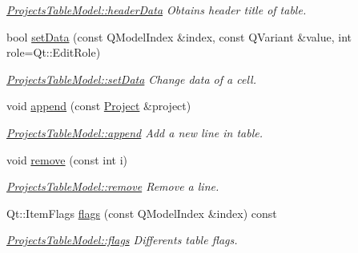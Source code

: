 \begin{DoxyCompactItemize}
\begin{DoxyCompactList}\small\item\em \hyperlink{classGui_1_1Widgets_1_1WdgModels_1_1ProjectsTableModel_ad984702eada2770507a1507ea9e3e685}{Projects\-Table\-Model\-::header\-Data} Obtains header title of table. \end{DoxyCompactList}\item 
bool \hyperlink{classGui_1_1Widgets_1_1WdgModels_1_1ProjectsTableModel_ae5072671b7fb73a4544a0cf913a38e53}{set\-Data} (const Q\-Model\-Index \&index, const Q\-Variant \&value, int role=Qt\-::\-Edit\-Role)
\begin{DoxyCompactList}\small\item\em \hyperlink{classGui_1_1Widgets_1_1WdgModels_1_1ProjectsTableModel_ae5072671b7fb73a4544a0cf913a38e53}{Projects\-Table\-Model\-::set\-Data} Change data of a cell. \end{DoxyCompactList}\item 
void \hyperlink{classGui_1_1Widgets_1_1WdgModels_1_1ProjectsTableModel_a9ef39bf8d33a49cc9c2ca6f77e41cd56}{append} (const \hyperlink{classModels_1_1Project}{Project} \&project)
\begin{DoxyCompactList}\small\item\em \hyperlink{classGui_1_1Widgets_1_1WdgModels_1_1ProjectsTableModel_a9ef39bf8d33a49cc9c2ca6f77e41cd56}{Projects\-Table\-Model\-::append} Add a new line in table. \end{DoxyCompactList}\item 
void \hyperlink{classGui_1_1Widgets_1_1WdgModels_1_1ProjectsTableModel_a696b8b328d2e354cb3155ab648ae5067}{remove} (const int i)
\begin{DoxyCompactList}\small\item\em \hyperlink{classGui_1_1Widgets_1_1WdgModels_1_1ProjectsTableModel_a696b8b328d2e354cb3155ab648ae5067}{Projects\-Table\-Model\-::remove} Remove a line. \end{DoxyCompactList}\item 
Qt\-::\-Item\-Flags \hyperlink{classGui_1_1Widgets_1_1WdgModels_1_1ProjectsTableModel_a94739f3784ae7ae93c85b5bebc6f9aa2}{flags} (const Q\-Model\-Index \&index) const 
\begin{DoxyCompactList}\small\item\em \hyperlink{classGui_1_1Widgets_1_1WdgModels_1_1ProjectsTableModel_a94739f3784ae7ae93c85b5bebc6f9aa2}{Projects\-Table\-Model\-::flags} Differents table flags. \end{DoxyCompactList}\item 

\end{DoxyCompactItemize}

